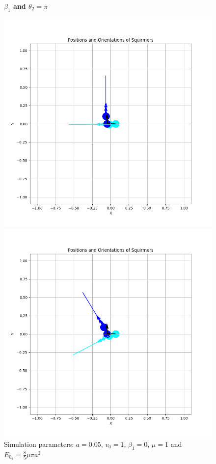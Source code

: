 \documentclass{article}
\begin{document}
\begin{figure}[H]
    \centering
    \textbf{$\beta_1$ and $\theta_2 = \pi$}\par\medskip
    \begin{minipage}{0.49\textwidth}
        \includegraphics[width=1\textwidth]{graphs/Eo_analysis/beta0/pi_/pi_Eo_brumley.png}
        \caption{\footnotesize Simulation parameters: $a=0.05$, $v_0=1$, $\beta_1=0$, $\mu=1$ and $E_{0_{2}}=\frac{8}{5}\mu\pi a^2$}
    \end{minipage}\hfill
    \begin{minipage}{0.49\textwidth}
        \includegraphics[width=1\textwidth]{graphs/Eo_analysis/beta0/pi_/pi_Eo_init.png}

\end{minipage}
\end{figure}
\end{document}
